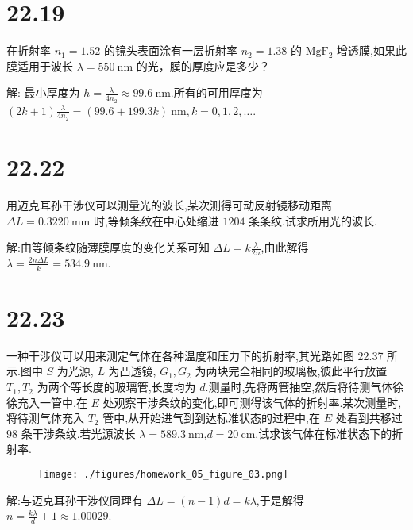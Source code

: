     \section{22.19} 在折射率 $n_1=1.52$ 的镜头表面涂有一层折射率 $n_2=1.38$ 的 $\mathrm{MgF_2}$ 增透膜,如果此膜适用于波长 $\lambda=550 \ \mathrm{nm}$ 的光，膜的厚度应是多少？

    解: 最小厚度为 $h=\frac{\lambda}{4n_2}\approx 99.6 \ \mathrm{nm}$.所有的可用厚度为 $\left( 2k+1 \right) \frac{\lambda}{4n_2}=\left( 99.6+199.3k \right) \ \mathrm{nm},k=0,1,2,\ldots$.
    \section{22.22} 用迈克耳孙干涉仪可以测量光的波长,某次测得可动反射镜移动距离 $\Delta L=0.3220 \ \mathrm{mm}$ 时,等倾条纹在中心处缩进 $1204$ 条条纹.试求所用光的波长.

    解:由等倾条纹随薄膜厚度的变化关系可知 $\Delta L=k \frac{\lambda}{2n}$,由此解得 $\lambda=\frac{2n\Delta L}{k}=534.9 \ \mathrm{nm}$.
    \section{22.23} 一种干涉仪可以用来测定气体在各种温度和压力下的折射率,其光路如图 22.37 所示.图中 $S$ 为光源, $L$ 为凸透镜, $G_1,G_2$ 为两块完全相同的玻璃板,彼此平行放置 $T_1,T_2$ 为两个等长度的玻璃管,长度均为 $d$.测量时,先将两管抽空,然后将待测气体徐徐充入一管中,在 $E$ 处观察干涉条纹的变化,即可测得该气体的折射率.某次测量时,将待测气体充入 $T_2$ 管中,从开始进气到到达标准状态的过程中,在 $E$ 处看到共移过 $98$ 条干涉条纹.若光源波长 $\lambda=589.3 \ \mathrm{nm}$,$d=20 \ \mathrm{cm}$,试求该气体在标准状态下的折射率.

    \begin{figure}[htbp]
        \centering
        \texttt{[image: ./figures/homework\_05\_figure\_03.png]}
    \end{figure}

    解:与迈克耳孙干涉仪同理有 $\Delta L=\left( n-1 \right) d=k \lambda$,于是解得 $n=\frac{k\lambda}{d}+1\approx 1.00029$.

